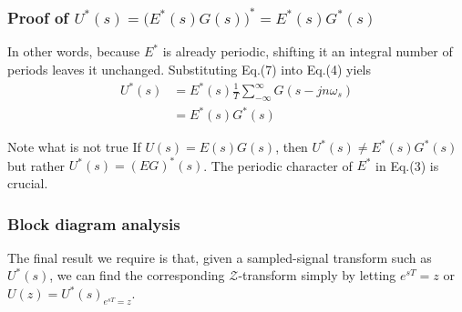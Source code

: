 \begin{frame}
	\frametitle{Proof of $U^{*}(s) = \big(E^{*}(s)G(s)\big)^{*} = E^{*}(s)G^{*}(s)$}
	In other words, because $E^{*}$ is already periodic, shifting it an integral number of periods leaves it unchanged. Substituting Eq.(7) into Eq.(4) yiels
	\begin{equation}
	\begin{split}
	U^{*}(s) &= E^{*}(s) \frac{1}{T} \sum_{-\infty}^{\infty} G(s - jn\omega_s)\\
	&= E^{*}(s)G^{*}(s)
	\end{split}
	\end{equation}
	\vspace{-1em}
	\begin{alertblock}{Note what is not true}
		If $U(s) = E(s)G(s)$, then $U^{*}(s) \neq E^{*}(s) G^{*}(s)$ but rather $U^{*}(s) = (EG)^{*}(s)$. The periodic character of $E^{*}$ in Eq.(3) is crucial.
	\end{alertblock}
\end{frame}

\begin{frame}
	\frametitle{Block diagram analysis}
	The final result we require is that, given a sampled-signal transform such as $U^{*}(s)$, we can find the corresponding $\mathcal{Z}$-transform simply by letting $e^{sT} = z$ or $U(z) = U^{*}(s)_{e^{sT} = z}$.
\end{frame}